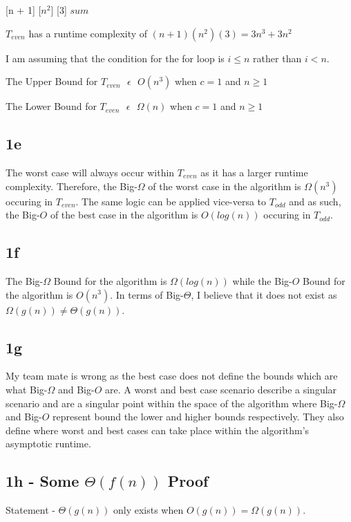 \documentclass[oneside, a4paper]{article}
\begin{document}
\begin{algorithmic}
     [n + 1]
         [$n^2$]
             [3]
        \EndFor
    \EndFor
    \State \Return $sum$
    \EndFunction
\end{algorithmic}

$T_{even}$ has a runtime complexity of $(n+1)(n^2)(3) = 3n^3 + 3n^2$

I am assuming that the condition for the for loop is $i \leq n$ rather than $i < n$.  

The Upper Bound for $T_{even} \text{ } \epsilon \text{ } O(n^3)$ when $c = 1$ and $n \geq 1$

The Lower Bound for $T_{even} \text{ } \epsilon \text{ } \Omega(n)$ when $c = 1$ and $n \geq 1$ 

\subsection{1e}
The worst case will always occur within $T_{even}$ as it has a larger runtime complexity. Therefore, the Big-$\Omega$ of the worst case in the algorithm is $\Omega(n^3)$ occuring in $T_{even}$. The same logic can be applied vice-versa to $T_{odd}$ and as such, the Big-$O$ of the best case in the algorithm is $O(log(n))$ occuring in $T_{odd}$.

\subsection{1f}
The Big-$\Omega$ Bound for the algorithm is $\Omega(log(n))$ while the Big-$O$ Bound for the algorithm is $O(n^3)$. In terms of Big-$\Theta$, I believe that it does not exist as $\Omega(g(n)) \neq \Theta(g(n))$.


\subsection{1g}
My team mate is wrong as the best case does not define the bounds which are what Big-$\Omega$ and Big-$O$ are. A worst and best case scenario describe a singular scenario and are a singular point within the space of the algorithm where Big-$\Omega$ and Big-$O$ represent bound the lower and higher bounds respectively. They also define where worst and best cases can take place within the algorithm's asymptotic runtime.

\subsection{1h - Some $\Theta(f(n))$ Proof}
Statement - $\Theta(g(n))$ only exists when $O(g(n)) = \Omega(g(n))$. 
\end{document}
